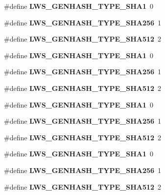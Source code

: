 \begin{DoxyCompactItemize}
\#define {\bfseries L\+W\+S\+\_\+\+G\+E\+N\+H\+A\+S\+H\+\_\+\+T\+Y\+P\+E\+\_\+\+S\+H\+A1}~0
\item 
\mbox{\label{group__generic_gaf1a9c0afabf5a3ad37746a6d499e19a0}} 
\#define {\bfseries L\+W\+S\+\_\+\+G\+E\+N\+H\+A\+S\+H\+\_\+\+T\+Y\+P\+E\+\_\+\+S\+H\+A256}~1
\item 
\mbox{\label{group__generic_ga90cb67a0ac4feb75c735041c2c1b4c4d}} 
\#define {\bfseries L\+W\+S\+\_\+\+G\+E\+N\+H\+A\+S\+H\+\_\+\+T\+Y\+P\+E\+\_\+\+S\+H\+A512}~2
\item 
\mbox{\label{group__generic_gaf79ee123a42ff29b1ab52b5ef02c0825}} 
\#define {\bfseries L\+W\+S\+\_\+\+G\+E\+N\+H\+A\+S\+H\+\_\+\+T\+Y\+P\+E\+\_\+\+S\+H\+A1}~0
\item 
\mbox{\label{group__generic_gaf1a9c0afabf5a3ad37746a6d499e19a0}} 
\#define {\bfseries L\+W\+S\+\_\+\+G\+E\+N\+H\+A\+S\+H\+\_\+\+T\+Y\+P\+E\+\_\+\+S\+H\+A256}~1
\item 
\mbox{\label{group__generic_ga90cb67a0ac4feb75c735041c2c1b4c4d}} 
\#define {\bfseries L\+W\+S\+\_\+\+G\+E\+N\+H\+A\+S\+H\+\_\+\+T\+Y\+P\+E\+\_\+\+S\+H\+A512}~2
\item 
\mbox{\label{group__generic_gaf79ee123a42ff29b1ab52b5ef02c0825}} 
\#define {\bfseries L\+W\+S\+\_\+\+G\+E\+N\+H\+A\+S\+H\+\_\+\+T\+Y\+P\+E\+\_\+\+S\+H\+A1}~0
\item 
\mbox{\label{group__generic_gaf1a9c0afabf5a3ad37746a6d499e19a0}} 
\#define {\bfseries L\+W\+S\+\_\+\+G\+E\+N\+H\+A\+S\+H\+\_\+\+T\+Y\+P\+E\+\_\+\+S\+H\+A256}~1
\item 
\mbox{\label{group__generic_ga90cb67a0ac4feb75c735041c2c1b4c4d}} 
\#define {\bfseries L\+W\+S\+\_\+\+G\+E\+N\+H\+A\+S\+H\+\_\+\+T\+Y\+P\+E\+\_\+\+S\+H\+A512}~2
\item 
\mbox{\label{group__generic_gaf79ee123a42ff29b1ab52b5ef02c0825}} 
\#define {\bfseries L\+W\+S\+\_\+\+G\+E\+N\+H\+A\+S\+H\+\_\+\+T\+Y\+P\+E\+\_\+\+S\+H\+A1}~0
\item 
\mbox{\label{group__generic_gaf1a9c0afabf5a3ad37746a6d499e19a0}} 
\#define {\bfseries L\+W\+S\+\_\+\+G\+E\+N\+H\+A\+S\+H\+\_\+\+T\+Y\+P\+E\+\_\+\+S\+H\+A256}~1
\item 
\mbox{\label{group__generic_ga90cb67a0ac4feb75c735041c2c1b4c4d}} 
\#define {\bfseries L\+W\+S\+\_\+\+G\+E\+N\+H\+A\+S\+H\+\_\+\+T\+Y\+P\+E\+\_\+\+S\+H\+A512}~2
\end{DoxyCompactItemize}
